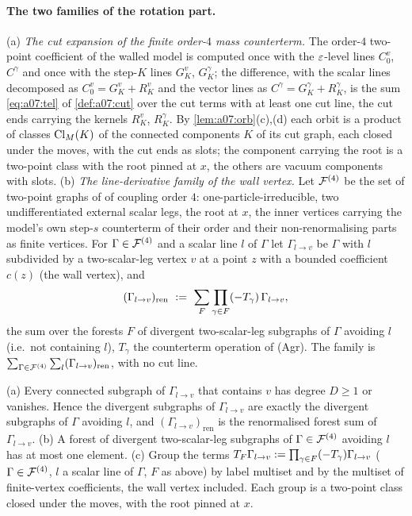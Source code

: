 \paragraph{The two families of the rotation part.} (a) \emph{The cut expansion of the finite order-$4$ mass counterterm.} The order-$4$ two-point coefficient of the walled model is computed once with the $\varepsilon$-level lines $C^v_0$, $C^\gamma$ and once with the step-$K$ lines $G^v_K$, $G^\gamma_K$; the difference, with the scalar lines decomposed as $C^v_0=G^v_K+R^v_K$ and the vector lines as $C^\gamma=G^\gamma_K+R^\gamma_K$, is the sum \eqref{eq:a07:tel} of \cref{def:a07:cut} over the cut terms with at least one cut line, the cut ends carrying the kernels $R^v_K$, $R^\gamma_K$. By \cref{lem:a07:orb}(c),(d) each orbit is a product of classes $\operatorname{Cl}_M(K)$ of the connected components $K$ of its cut graph, each closed under the moves, with the cut ends as slots; the component carrying the root is a two-point class with the root pinned at $x$, the others are vacuum components with slots. (b) \emph{The line-derivative family of the wall vertex.} Let $\mathcal F^{(4)}$ be the set of two-point graphs of \cite[(1.23)]{Ba3} of coupling order $4$: one-particle-irreducible, two undifferentiated external scalar legs, the root at $x$, the inner \cite[(1.7)]{Ba3} vertices carrying the model's own step-$s$ counterterm of their order and their non-renormalising parts as finite vertices. For $\Gamma\in\mathcal F^{(4)}$ and a scalar line $l$ of $\Gamma$ let $\Gamma_{l\to v}$ be $\Gamma$ with $l$ subdivided by a two-scalar-leg vertex $v$ at a point $z$ with a bounded coefficient $c(z)$ (the wall vertex), and
\[
(\Gamma_{l\to v})_{\mathrm{ren}}\ :=\ \sum_{F}\prod_{\gamma\in F}(-T_\gamma)\,\Gamma_{l\to v},
\]
the sum over the forests $F$ of divergent two-scalar-leg subgraphs of $\Gamma$ avoiding $l$ (i.e.\ not containing $l$), $T_\gamma$ the counterterm operation of (Agr). The family is $\sum_{\Gamma\in\mathcal F^{(4)}}\sum_l(\Gamma_{l\to v})_{\mathrm{ren}}$, with no cut line.

\begin{lemma}\label{lem:a06:WNNC}
\textup{(a)} Every connected subgraph of $\Gamma_{l\to v}$ that contains $v$ has degree $D\ge1$ or vanishes. Hence the divergent subgraphs of $\Gamma_{l\to v}$ are exactly the divergent subgraphs of $\Gamma$ avoiding $l$, and $(\Gamma_{l\to v})_{\mathrm{ren}}$ is the renormalised forest sum of $\Gamma_{l\to v}$. \textup{(b)} A forest of divergent two-scalar-leg subgraphs of $\Gamma\in\mathcal F^{(4)}$ avoiding $l$ has at most one element. \textup{(c)} Group the terms $T_F\Gamma_{l\to v}:=\prod_{\gamma\in F}(-T_\gamma)\Gamma_{l\to v}$ ($\Gamma\in\mathcal F^{(4)}$, $l$ a scalar line of $\Gamma$, $F$ as above) by label multiset and by the multiset of finite-vertex coefficients, the wall vertex included. Each group is a two-point class closed under the moves, with the root pinned at $x$.
\end{lemma}

